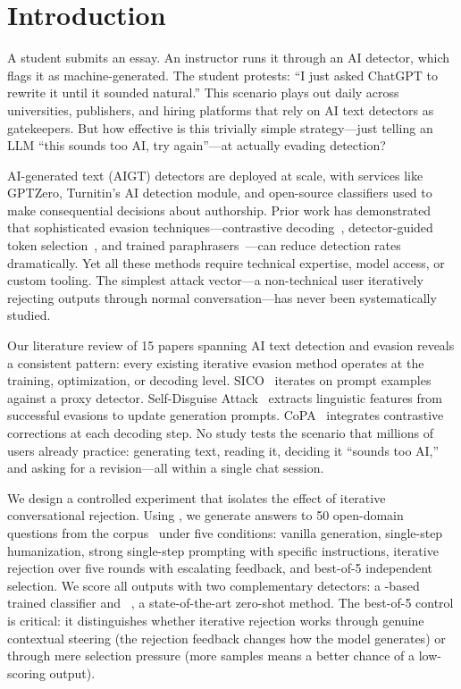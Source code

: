 \section{Introduction}
\label{sec:introduction}

A student submits an essay. An instructor runs it through an AI detector, which flags it as machine-generated. The student protests: ``I just asked ChatGPT to rewrite it until it sounded natural.'' This scenario plays out daily across universities, publishers, and hiring platforms that rely on AI text detectors as gatekeepers. But how effective is this trivially simple strategy---just telling an LLM ``this sounds too AI, try again''---at actually evading detection?

AI-generated text (AIGT) detectors are deployed at scale, with services like GPTZero, Turnitin's AI detection module, and open-source classifiers used to make consequential decisions about authorship.
Prior work has demonstrated that sophisticated evasion techniques---contrastive decoding~\cite{fang2025copa}, detector-guided token selection~\cite{cheng2025adversarial}, and trained paraphrasers~\cite{krishna2023paraphrasing}---can reduce detection rates dramatically.
Yet all these methods require technical expertise, model access, or custom tooling.
The simplest attack vector---a non-technical user iteratively rejecting outputs through normal conversation---has never been systematically studied.

Our literature review of 15 papers spanning AI text detection and evasion reveals a consistent pattern: every existing iterative evasion method operates at the training, optimization, or decoding level.
SICO~\cite{lu2024sico} iterates on prompt examples against a proxy detector.
Self-Disguise Attack~\cite{zhou2025sda} extracts linguistic features from successful evasions to update generation prompts.
CoPA~\cite{fang2025copa} integrates contrastive corrections at each decoding step.
No study tests the scenario that millions of users already practice: generating text, reading it, deciding it ``sounds too AI,'' and asking for a revision---all within a single chat session.

We design a controlled experiment that isolates the effect of iterative conversational rejection.
Using \gptfour, we generate answers to 50 open-domain questions from the \hcthree corpus~\cite{guo2023hc3} under five conditions: vanilla generation, single-step humanization, strong single-step prompting with specific instructions, iterative rejection over five rounds with escalating feedback, and best-of-5 independent selection.
We score all outputs with two complementary detectors: a \roberta-based trained classifier and \binoculars~\cite{hans2024binoculars}, a state-of-the-art zero-shot method.
The best-of-5 control is critical: it distinguishes whether iterative rejection works through genuine contextual steering (the rejection feedback changes how the model generates) or through mere selection pressure (more samples means a better chance of a low-scoring output).

